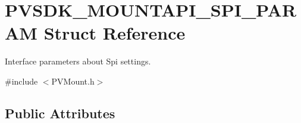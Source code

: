 \hypertarget{struct_p_v_s_d_k___m_o_u_n_t_a_p_i___s_p_i___p_a_r_a_m}{}\section{P\+V\+S\+D\+K\+\_\+\+M\+O\+U\+N\+T\+A\+P\+I\+\_\+\+S\+P\+I\+\_\+\+P\+A\+R\+AM Struct Reference}
\label{struct_p_v_s_d_k___m_o_u_n_t_a_p_i___s_p_i___p_a_r_a_m}


Interface parameters about Spi settings.  




{\ttfamily \#include $<$P\+V\+Mount.\+h$>$}

\subsection*{Public Attributes}
